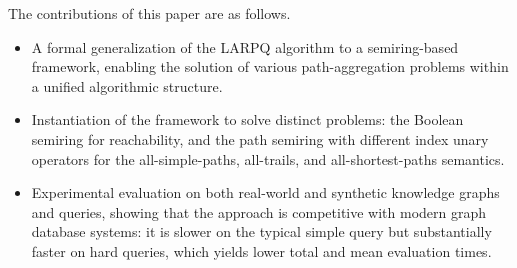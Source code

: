 The contributions of this paper are as follows.
\begin{itemize}
	\item A formal generalization of the LARPQ algorithm to a semiring-based framework, enabling the solution of various path-aggregation problems within a unified algorithmic structure.
	\item Instantiation of the framework to solve distinct problems: the Boolean semiring for reachability, and the path semiring with different index unary operators for the all-simple-paths, all-trails, and all-shortest-paths semantics.
	\item Experimental evaluation on both real-world and synthetic knowledge graphs and queries, showing that the approach is competitive with modern graph database systems: it is slower on the typical simple query but substantially faster on hard queries, which yields lower total and mean evaluation times.
\end{itemize}